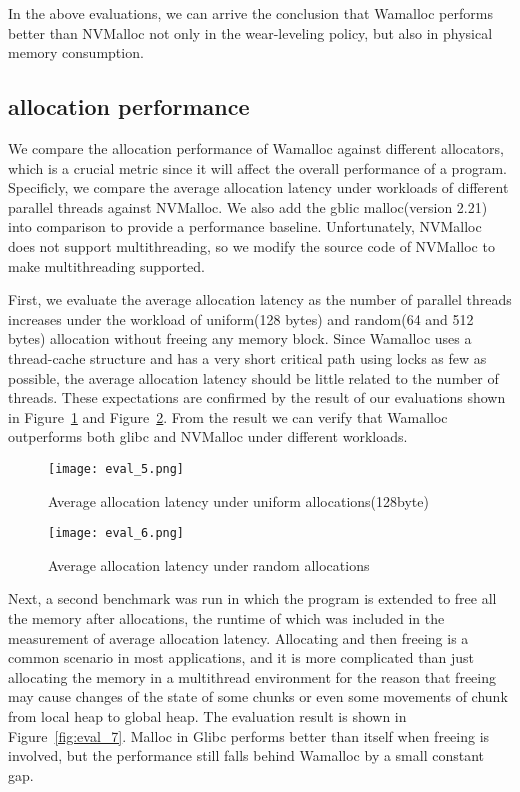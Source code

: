 \documentclass[10pt, conference, compsocconf]{IEEEtran}
\begin{document}
In the above evaluations, we can arrive the conclusion that
Wamalloc performs better than NVMalloc not only in the wear-leveling policy,
but also in physical memory consumption.

\subsection{allocation performance}

We compare the allocation performance of Wamalloc against different allocators,
which is a crucial metric since it will affect the overall performance of a program.
Specificly, we compare the average allocation latency under workloads of different parallel threads against NVMalloc.
We also add the gblic malloc(version 2.21) into comparison to provide a performance baseline.
Unfortunately, NVMalloc does not support multithreading,
so we modify the source code of NVMalloc to make multithreading supported.

First, we evaluate the average allocation latency as the number of parallel threads increases
under the workload of uniform(128 bytes) and random(64 and 512 bytes) allocation without freeing any memory block.
Since Wamalloc uses a thread-cache structure and has a very short critical path using locks as few as possible,
the average allocation latency should be little related to the number of threads.
These expectations are confirmed by the result of our evaluations shown in Figure~\ref{fig:eval_5} and Figure~\ref{fig:eval_6}.
From the result we can verify that Wamalloc outperforms both glibc and NVMalloc under different workloads.


\begin{figure}[t]
\centering
\texttt{[image: eval\_5.png]}
\caption{Average allocation latency under uniform allocations(128byte)}
\label{fig:eval_5}
\end{figure}

\begin{figure}[t]
\centering
\texttt{[image: eval\_6.png]}
\caption{Average allocation latency under random allocations}
\label{fig:eval_6}
\end{figure}

Next, a second benchmark was run in which the program is extended to free all the memory after allocations, 
the runtime of which was included in the measurement of average allocation latency.
Allocating and then freeing is a common scenario in most applications, 
and it is more complicated than just allocating the memory in a multithread environment 
for the reason that freeing may cause changes of the state of some chunks or even some movements of chunk from local heap to global heap.
The evaluation result is shown in Figure~\ref{fig:eval_7}.
Malloc in Glibc performs better than itself when freeing is involved, 
but the performance still falls behind Wamalloc by a small constant gap.
\end{document}

